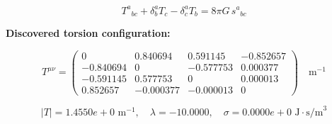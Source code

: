 
\begin{equation}
  T^a{}_{bc} + \delta^a_b T_c - \delta^a_c T_b = 8\pi G \, s^a{}_{bc}
\end{equation}

\textbf{Discovered torsion configuration:}

\begin{equation}
  T^{\mu\nu} = \begin{pmatrix}
    0 & 0.840694 & 0.591145 & -0.852657 \\
    -0.840694 & 0 & -0.577753 & 0.000377 \\
    -0.591145 & 0.577753 & 0 & 0.000013 \\
    0.852657 & -0.000377 & -0.000013 & 0
  \end{pmatrix} \quad \text{m}^{-1}
\end{equation}

\begin{equation}
  |T| = 1.4550e+0 \text{ m}^{-1}, \quad
  \lambda = -10.0000, \quad
  \sigma = 0.0000e+0 \text{ J}\cdot\text{s/m}^3
\end{equation}